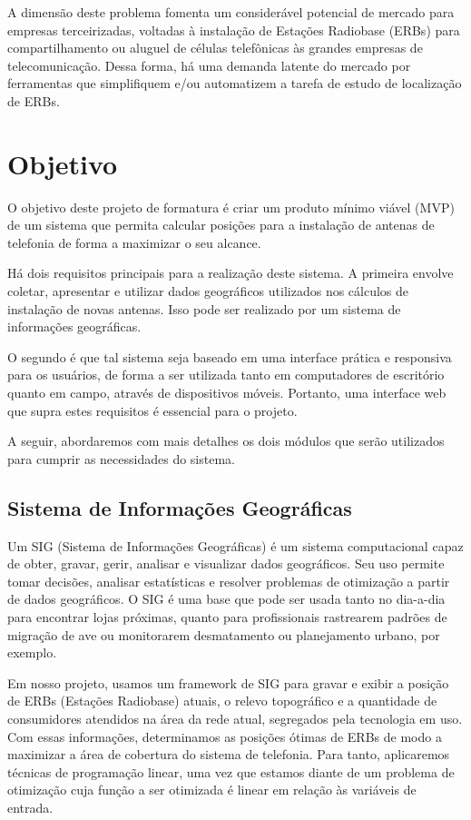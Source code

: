 \documentclass[]{politex}
\begin{document}
A dimensão deste problema fomenta um considerável potencial de mercado para
empresas terceirizadas, voltadas à instalação de Estações Radiobase (ERBs) para
compartilhamento ou aluguel de células telefônicas às grandes empresas de
telecomunicação. Dessa forma, há uma demanda latente do mercado por ferramentas
que simplifiquem e/ou automatizem a tarefa de estudo de localização de ERBs.

\section{Objetivo}

O objetivo deste projeto de formatura é criar um produto mínimo viável (MVP) de
um sistema que permita calcular posições para a instalação de antenas de
telefonia de forma a maximizar o seu alcance.

Há dois requisitos principais para a realização deste sistema. A primeira envolve
coletar, apresentar e utilizar dados geográficos utilizados nos cálculos
de instalação de novas antenas. Isso pode ser realizado por um sistema de
informações geográficas.

O segundo é que tal sistema seja baseado em uma interface prática e responsiva
para os usuários, de forma a ser utilizada tanto em computadores de escritório
quanto em campo, através de dispositivos móveis. Portanto, uma interface web que
supra estes requisitos é essencial para o projeto.

A seguir, abordaremos com mais detalhes os dois módulos que serão utilizados
para cumprir as necessidades do sistema.

\subsection{Sistema de Informações Geográficas}

Um SIG (Sistema de Informações Geográficas) é um sistema computacional capaz de
obter, gravar, gerir, analisar e visualizar dados geográficos. Seu uso permite
tomar decisões, analisar estatísticas e resolver problemas de otimização a
partir de dados geográficos. O SIG é uma base que pode ser usada tanto no
dia-a-dia para encontrar lojas próximas, quanto para profissionais rastrearem
padrões de migração de ave ou monitorarem desmatamento ou planejamento urbano,
por exemplo.

Em nosso projeto, usamos um framework de SIG para gravar e exibir a posição de
ERBs (Estações Radiobase) atuais, o relevo topográfico e a quantidade de
consumidores atendidos na área da rede atual, segregados pela tecnologia em uso.
Com essas informações, determinamos as posições ótimas de ERBs de modo a
maximizar a área de cobertura do sistema de telefonia. Para tanto, aplicaremos
técnicas de programação linear, uma vez que estamos diante de um problema de
otimização cuja função a ser otimizada é linear em relação às variáveis de
entrada.
\end{document}
